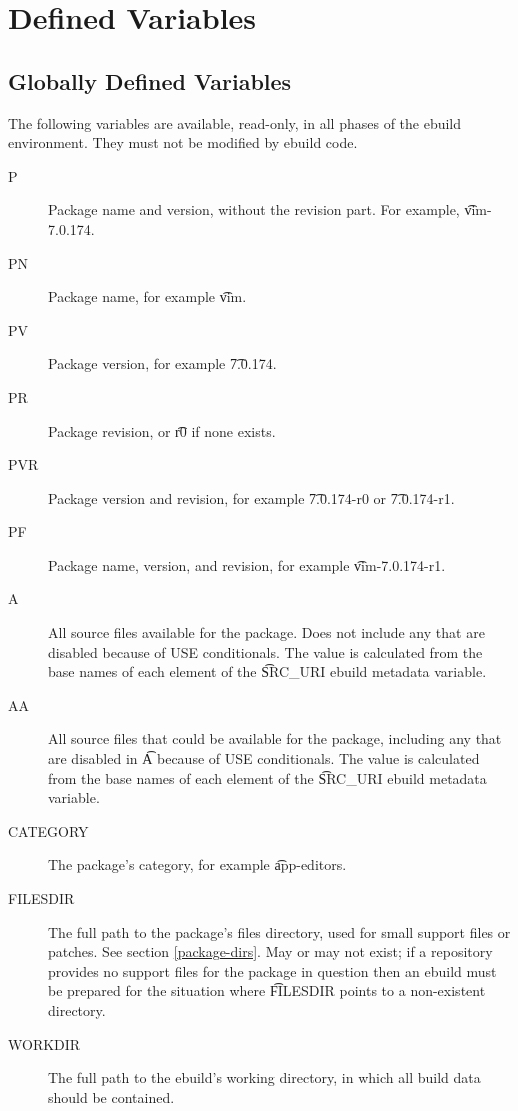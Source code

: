 \section{Defined Variables}
\label{ebuild-env-vars}

\subsection{Globally Defined Variables}
\label{global-ebuild-vars}

The following variables are available, read-only, in all phases of the ebuild environment. They
must not be modified by ebuild code.
\begin{description}
\item[P] Package name and version, without the revision part. For example, \t{vim-7.0.174}.
\item[PN] Package name, for example \t{vim}.
\item[PV] Package version, for example \t{7.0.174}.
\item[PR] Package revision, or \t{r0} if none exists.
\item[PVR] Package version and revision, for example \t{7.0.174-r0} or \t{7.0.174-r1}.
\item[PF] Package name, version, and revision, for example \t{vim-7.0.174-r1}.
\item[A] All source files available for the package. Does not include any that are disabled because
    of USE conditionals. The value is calculated from the base names of each element of the
    \t{SRC\_URI} ebuild metadata variable.
\item[AA] All source files that could be available for the package, including any that are disabled
    in \t{A} because of USE conditionals. The value is calculated from the base names of each element
    of the \t{SRC\_URI} ebuild metadata variable.
\item[CATEGORY] The package's category, for example \t{app-editors}.
\item[FILESDIR] The full path to the package's files directory, used for small support files or
    patches. See section \ref{package-dirs}. May or may not exist; if a repository provides no
    support files for the package in question then an ebuild must be prepared for the situation
    where \t{FILESDIR} points to a non-existent directory.
\item[WORKDIR] The full path to the ebuild's working directory, in which all build data should be
    contained. \label{env-var-WORKDIR}

\end{description}
